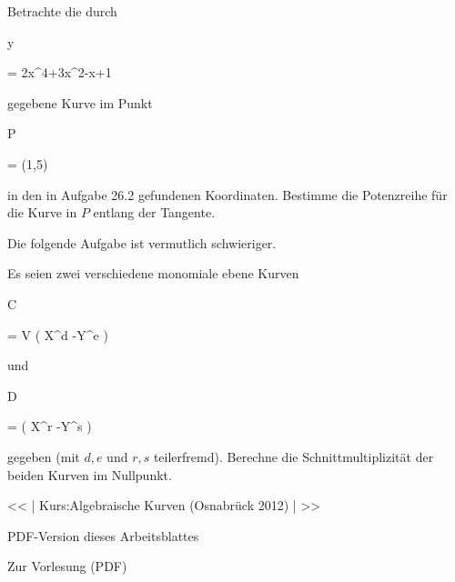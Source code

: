 {}

{


Betrachte die durch


\mavergleichskette

{\vergleichskette

{ y
}

{ = }{ 2x^4+3x^2-x+1
}

{  }{
}

{    }{
}

{   }{
}

}
{}{}{}
gegebene Kurve im Punkt


\mavergleichskette

{\vergleichskette

{ P
}

{ = }{ (1,5)
}

{  }{
}

{    }{
}

{   }{
}

}
{}{}{}
in den in
Aufgabe 26.2
gefundenen Koordinaten. Bestimme die Potenzreihe für die Kurve in $P$ entlang der Tangente.


}

{} {}


Die folgende Aufgabe ist vermutlich schwieriger.



{}

{


Es seien zwei verschiedene monomiale ebene Kurven


\mavergleichskette

{\vergleichskette

{ C
}

{ = }{ V \left(  X^d -Y^e   \right)
}

{  }{
}

{    }{
}

{   }{
}

}
{}{}{}
und


\mavergleichskette

{\vergleichskette

{ D
}

{ = }{  \left(  X^r -Y^s  \right)
}

{  }{
}

{    }{
}

{   }{
}

}
{}{}{}
gegeben (mit $d,e$ und $r,s$ teilerfremd). Berechne die Schnittmultiplizität der beiden Kurven im Nullpunkt.


}

{} {}


<< | Kurs:Algebraische Kurven (Osnabrück 2012) | >>


PDF-Version dieses Arbeitsblattes


 Zur Vorlesung
(PDF)
